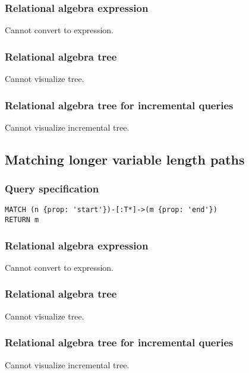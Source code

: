 \subsubsection*{Relational algebra expression}

Cannot convert to expression.

\subsubsection*{Relational algebra tree}

Cannot visualize tree.

\subsubsection*{Relational algebra tree for incremental queries}

Cannot visualize incremental tree.

\subsection{Matching longer variable length paths}

\subsubsection*{Query specification}

\begin{lstlisting}
MATCH (n {prop: 'start'})-[:T*]->(m {prop: 'end'})
RETURN m
\end{lstlisting}

\subsubsection*{Relational algebra expression}

Cannot convert to expression.

\subsubsection*{Relational algebra tree}

Cannot visualize tree.

\subsubsection*{Relational algebra tree for incremental queries}

Cannot visualize incremental tree.


